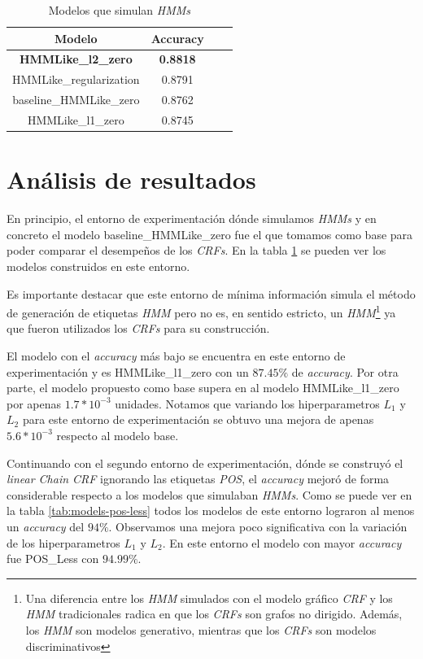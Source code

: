 \documentclass[letterpaper,12pt,oneside]{book}
\newcommand{\note}[4][]{\todo[author=#2,color=#3,size=\scriptsize,fancyline,caption={},#1]{#4}} %
\newcommand{\diego}[2][]{\note[#1]{Diego}{blue!40}{#2}}
\theoremstyle{definition}
\begin{document}
\begin{table}[ht]
    \centering
    \begin{tabular}{| c | c | c | c |}\hline
    \textbf{Modelo} & \textbf{Accuracy}\\\hline
    \textbf{\textsf{HMMLike\_l2\_zero}} & \textbf{0.8818}\\
    \textsf{HMMLike\_regularization} & 0.8791\\
    \textsf{baseline\_HMMLike\_zero} & 0.8762\\
    \textsf{HMMLike\_l1\_zero} & 0.8745\\\hline
    \end{tabular}
    \caption{Modelos que simulan \textit{HMMs}}
    \label{tab:models-hmmlike}
\end{table}

\section{Análisis de resultados}

En principio, el entorno de experimentación dónde simulamos \textit{HMMs} y en concreto el modelo \textsf{baseline\_HMMLike\_zero} fue el que tomamos como base para poder comparar el desempeños de los \textit{CRFs}. En la tabla \ref{tab:models-hmmlike} se pueden ver los modelos construidos en este entorno.

Es importante destacar que este entorno de mínima información simula el método de generación de etiquetas \textit{HMM} pero no es, en sentido estricto, un \textit{HMM}\footnote{Una diferencia entre los \textit{HMM} simulados con el modelo gráfico \textit{CRF} y los \textit{HMM} tradicionales radica en que los \textit{CRFs} son grafos no dirigido. Además, los \textit{HMM} son modelos generativo, mientras que los \textit{CRFs} son modelos discriminativos}
\diego{referencia} ya que fueron utilizados los \textit{CRFs} para su construcción.

El modelo con el \textit{accuracy} más bajo se encuentra en este entorno de experimentación y es \textsf{HMMLike\_l1\_zero} con un $87.45\%$ de \textit{accuracy}. Por otra parte, el modelo propuesto como base supera en al modelo \textsf{HMMLike\_l1\_zero} por apenas $1.7*10^{-3}$ unidades. Notamos que variando los hiperparametros $L_1$ y $L_2$ para este entorno de experimentación se obtuvo una mejora de apenas $5.6*10^{-3}$ respecto al modelo base. 

Continuando con el segundo entorno de experimentación, dónde se construyó el \textit{linear Chain CRF} ignorando las etiquetas \textit{POS}, el \textit{accuracy} mejoró de forma considerable respecto a los modelos que simulaban \textit{HMMs}. Como se puede ver en la tabla \ref{tab:models-pos-less} todos los modelos de este entorno lograron al menos un \textit{accuracy} del $94\%$. Observamos una mejora poco significativa con la variación de los hiperparametros $L_1$ y $L_2$. En este entorno el modelo con mayor \textit{accuracy} fue \textsf{POS\_Less} con $94.99\%$. 
\end{document}
